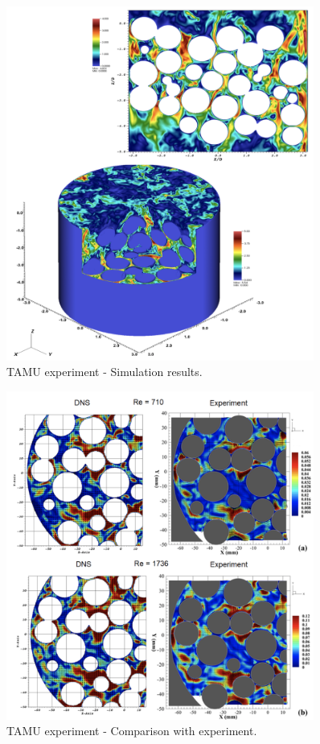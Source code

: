 \begin{figure}[!h]
\centering
\includegraphics[clip=true,width=0.9\textwidth]{Figures/pb_tamu3}
\caption{TAMU experiment - Simulation results.}
\label{f:tamu3}
\end{figure}

\begin{figure}[!h]
\centering
\includegraphics[clip=true,width=0.9\textwidth]{Figures/pb_tamu4}
\caption{TAMU experiment - Comparison with experiment. }
\label{f:tamu4}
\end{figure}

